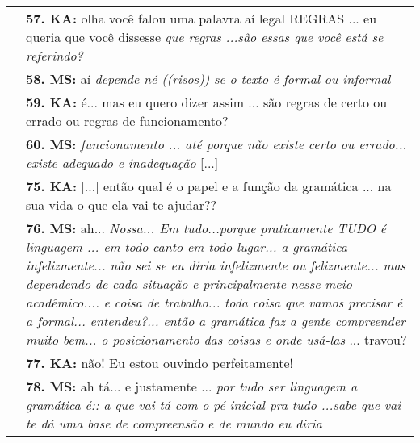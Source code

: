 \begin{table}[!htpb]
\begin{threeparttable}
\begin{tabular}{@{} 
				>{\raggedright\arraybackslash}p{} 
				>{\raggedright\arraybackslash}p{} @{}}
			& \textbf{57. KA:} olha você falou uma palavra aí legal REGRAS ... eu queria que você dissesse \emph{que regras ...são essas que você está se referindo?} \\
			
			& \textbf{58. MS:} aí \emph{depende né ((risos)) se o texto é formal ou informal} \\
			
			& \textbf{59. KA:} é... mas eu quero dizer assim ... são regras de certo ou errado ou regras de funcionamento? \\
			
			& \textbf{60. MS:} \emph{funcionamento ... até porque não existe certo ou errado... existe adequado e inadequação} {[}...{]} \\
			
			& \textbf{75. KA:} {[}...{]} então qual é o papel e a função da gramática ... na sua vida o que ela vai te ajudar?? \\
			
			& \textbf{76. MS:} ah... \emph{Nossa... Em tudo...porque praticamente TUDO é linguagem ... em todo canto em todo lugar... a gramática infelizmente... não sei se eu diria infelizmente ou felizmente... mas dependendo de cada situação e principalmente nesse meio acadêmico.... e coisa de trabalho... toda coisa que vamos precisar é a formal... entendeu?... então a gramática faz a gente compreender muito bem... o posicionamento das coisas e onde usá-las} ... travou? \\
			
			& \textbf{77. KA:} não! Eu estou ouvindo perfeitamente! \\
			
			& \textbf{78. MS:} ah tá... e justamente ... \emph{por tudo ser linguagem a gramática é:: a que vai tá com o pé inicial pra tudo ...sabe que vai te dá uma base de compreensão e de mundo eu diria}  \\
			\bottomrule
		\end{tabular}
	\end{threeparttable}
\end{table}
